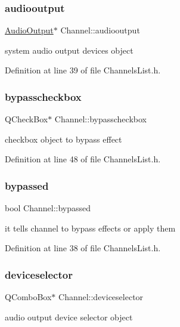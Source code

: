 \subsubsection{\texorpdfstring{audiooutput}{audiooutput}}
{\footnotesize\ttfamily \hyperlink{class_audio_output}{Audio\+Output}$\ast$ Channel\+::audiooutput}

system audio output devices object 

Definition at line 39 of file Channels\+List.\+h.

\mbox{\label{class_channel_a285eab1752d5e9407e1bc1e75353df34}} 
\subsubsection{\texorpdfstring{bypasscheckbox}{bypasscheckbox}}
{\footnotesize\ttfamily Q\+Check\+Box$\ast$ Channel\+::bypasscheckbox}

checkbox object to bypass effect 

Definition at line 48 of file Channels\+List.\+h.

\mbox{\label{class_channel_a94507945240717f2570e3baadd02d08a}} 
\subsubsection{\texorpdfstring{bypassed}{bypassed}}
{\footnotesize\ttfamily bool Channel\+::bypassed}

it tells channel to bypass effects or apply them 

Definition at line 38 of file Channels\+List.\+h.

\mbox{\label{class_channel_a9dcb50dc41866fbe60424553f1b910fa}} 
\subsubsection{\texorpdfstring{deviceselector}{deviceselector}}
{\footnotesize\ttfamily Q\+Combo\+Box$\ast$ Channel\+::deviceselector}

audio output device selector object 

